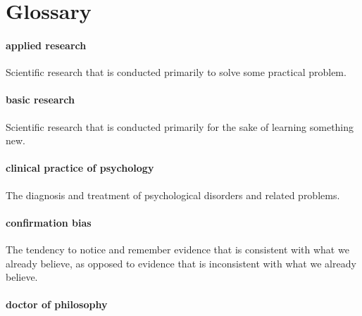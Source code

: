 \documentclass[
]{krantz}
\begin{document}
\hypertarget{glossary}{%
\section{Glossary}\label{glossary}}

\hypertarget{applied-research}{%
\paragraph*{applied research}\label{applied-research}}

Scientific research that is conducted primarily to solve some practical problem.

\hypertarget{basic-research}{%
\paragraph*{basic research}\label{basic-research}}

Scientific research that is conducted primarily for the sake of learning something new.

\hypertarget{clinical-practice-of-psychology}{%
\paragraph*{clinical practice of psychology}\label{clinical-practice-of-psychology}}

The diagnosis and treatment of psychological disorders and related problems.

\hypertarget{confirmation-bias}{%
\paragraph*{confirmation bias}\label{confirmation-bias}}

The tendency to notice and remember evidence that is consistent with what we already believe, as opposed to evidence that is inconsistent with what we already believe.

\hypertarget{doctor-of-philosophy}{%
\paragraph*{doctor of philosophy}\label{doctor-of-philosophy}}
\end{document}
